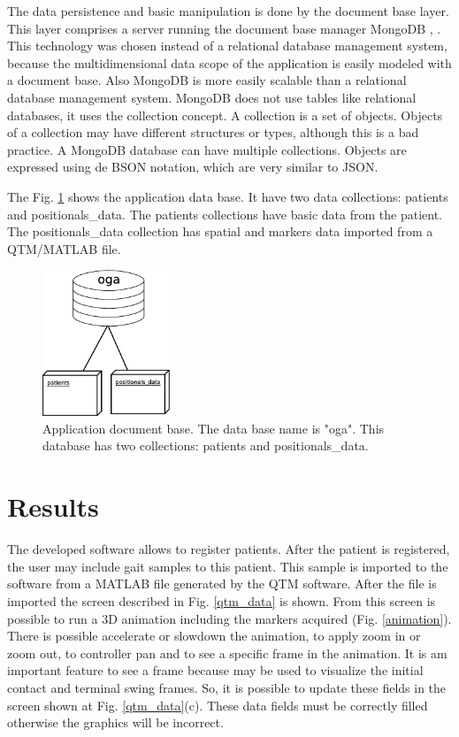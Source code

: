 \documentclass[journal]{IEEEtran}
\begin{document}
The data persistence and basic manipulation is done by the document base layer.
This layer comprises a server running the document base manager MongoDB 
\cite{Plugge2014}, \cite{Plugge2014}.
This technology was chosen instead of a relational database management system, 
because the multidimensional data scope of the application is easily  modeled with
a document base. Also MongoDB is more easily scalable than a relational database management system.
MongoDB does not use tables like relational databases, it uses the collection concept.
A collection is a set of objects. Objects of a collection may have different structures
or types, although this is a bad practice. A MongoDB database can have multiple collections.
Objects are expressed using de BSON notation, which are very similar to JSON.

The Fig. \ref{mongo_oga} shows the application data base.
It have two data collections: patients and positionals\_data.
The patients collections have basic data from the patient.
The positionals\_data collection has spatial and markers 
data imported from a QTM/MATLAB file.
\begin{figure}[!t]
	\centering
	\includegraphics[width=1.5in]{./mongo_oga.eps}
	\caption{Application document base. The data base name is "oga". 
	This database has two collections: patients and positionals\_data. 
	}
	\label{mongo_oga}
\end{figure}


\section{Results}

The developed software allows to register patients.
After the patient is registered, the user may include gait samples to this patient.
This sample is imported to the software from a MATLAB file generated by the QTM software.
After the file is imported the screen described in Fig. \ref{qtm_data} is shown.
From this screen is possible to run a 3D animation including the markers acquired (Fig. \ref{animation}).
There is possible accelerate or slowdown the animation, to apply zoom in or zoom out, to controller pan
and to see a specific frame in the animation.
It is am important feature to see a frame because may be used to visualize the initial contact
and terminal swing frames. 
So, it is possible to update these fields in the screen shown at Fig. \ref{qtm_data}(c).
These data fields must be correctly filled otherwise the graphics will be incorrect.
\end{document}
